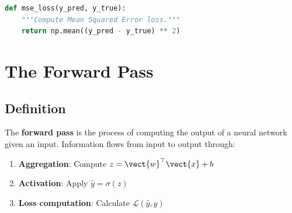 \begin{lstlisting}[language=Python, caption=Mean Squared Error Implementation]
def mse_loss(y_pred, y_true):
    """Compute Mean Squared Error loss."""
    return np.mean((y_pred - y_true) ** 2)
\end{lstlisting}


\section{The Forward Pass}

\subsection{Definition}

The \textbf{forward pass} is the process of computing the output of a neural network given an input. Information flows from input to output through:

\begin{enumerate}
    \item \textbf{Aggregation}: Compute $z = \vect{w}^\top \vect{x} + b$
    \item \textbf{Activation}: Apply $\hat{y} = \sigma(z)$
    \item \textbf{Loss computation}: Calculate $\mathcal{L}(\hat{y}, y)$
\end{enumerate}

\begin{center}
\end{center}


